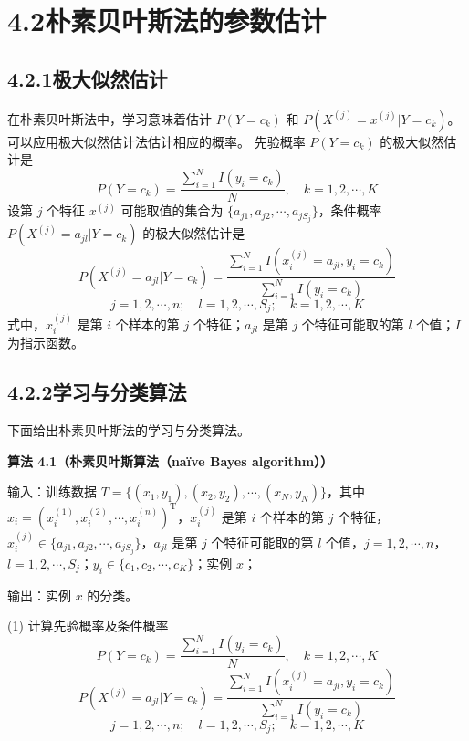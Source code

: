 \documentclass[UTF8,12pt,a4paper,fontset=fandol]{ctexart}
\begin{document}
\section*{4.2\quad 朴素贝叶斯法的参数估计}

\subsection*{4.2.1\quad 极大似然估计}

在朴素贝叶斯法中，学习意味着估计 $P(Y=c_k)$ 和 $P(X^{(j)}=x^{(j)}|Y=c_k)$。
可以应用极大似然估计法估计相应的概率。
先验概率 $P(Y=c_k)$ 的极大似然估计是
\begin{equation}
  P(Y=c_k)=\frac{\sum_{i=1}^N I(y_i=c_k)}{N},\quad k=1,2,\cdots,K
  \tag{4.8}
\end{equation}
设第 $j$ 个特征 $x^{(j)}$ 可能取值的集合为 $\{a_{j1},a_{j2},\cdots,a_{jS_j}\}$，条件概率 $P(X^{(j)}=a_{jl}|Y=c_k)$ 的极大似然估计是
\begin{equation}
  P(X^{(j)}=a_{jl}|Y=c_k)
  =
  \frac{\sum_{i=1}^N I(x_i^{(j)}=a_{jl},y_i=c_k)}
       {\sum_{i=1}^N I(y_i=c_k)}
\end{equation}
\[
  j=1,2,\cdots,n;\quad l=1,2,\cdots,S_j;\quad k=1,2,\cdots,K
  \tag{4.9}
\]
式中，$x_i^{(j)}$ 是第 $i$ 个样本的第 $j$ 个特征；$a_{jl}$ 是第 $j$ 个特征可能取的第 $l$ 个值；$I$ 为指示函数。

\subsection*{4.2.2\quad 学习与分类算法}

下面给出朴素贝叶斯法的学习与分类算法。

\noindent\textbf{算法 4.1（朴素贝叶斯算法（naïve Bayes algorithm））}

\noindent 输入：训练数据 $T=\{(x_1,y_1),(x_2,y_2),\cdots,(x_N,y_N)\}$，其中 $x_i=(x_i^{(1)},x_i^{(2)},\cdots,x_i^{(n)})^{\mathrm{T}}$，$x_i^{(j)}$ 是第 $i$ 个样本的第 $j$ 个特征，$x_i^{(j)}\in\{a_{j1},a_{j2},\cdots,a_{jS_j}\}$，$a_{jl}$ 是第 $j$ 个特征可能取的第 $l$ 个值，$j=1,2,\cdots,n$，$l=1,2,\cdots,S_j$；$y_i\in\{c_1,c_2,\cdots,c_K\}$；实例 $x$；

\noindent 输出：实例 $x$ 的分类。

(1) 计算先验概率及条件概率
\[
  P(Y=c_k)=\frac{\sum_{i=1}^N I(y_i=c_k)}{N},\quad k=1,2,\cdots,K
\]
\[
  P(X^{(j)}=a_{jl}|Y=c_k)
  =
  \frac{\sum_{i=1}^N I(x_i^{(j)}=a_{jl},y_i=c_k)}
       {\sum_{i=1}^N I(y_i=c_k)}
\]
\[
  j=1,2,\cdots,n;\quad l=1,2,\cdots,S_j;\quad k=1,2,\cdots,K
\]
\end{document}
